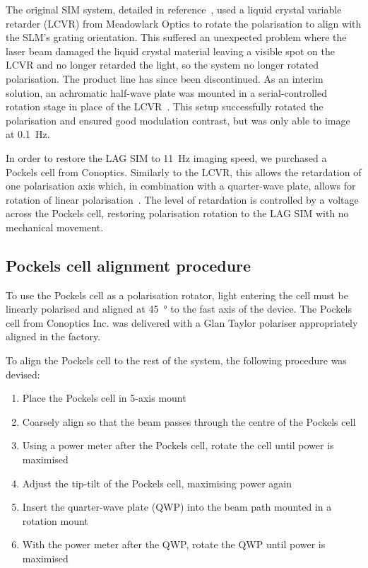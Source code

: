 
The original SIM system, detailed in reference~\cite{young2016guide}, used a liquid crystal variable retarder (LCVR) from Meadowlark Optics to rotate the polarisation to align with the SLM's grating orientation. 
This suffered an unexpected problem where the laser beam damaged the liquid crystal material leaving a visible spot on the LCVR and no longer retarded the light, so the system no longer rotated polarisation. 
The product line has since been discontinued.
As an interim solution, an achromatic half-wave plate was mounted in a serial-controlled rotation stage in place of the LCVR~\cite[\textit{ch. 8}]{hecht2017optics}. 
This setup successfully rotated the polarisation and ensured good modulation contrast, but was only able to image at \SI{0.1}{\hertz}. 

In order to restore the LAG SIM to \SI{11}{\hertz} imaging speed, we purchased a Pockels cell from Conoptics. 
Similarly to the LCVR, this allows the retardation of one polarisation axis which, in combination with a quarter-wave plate, allows for rotation of linear polarisation~\cite[\textit{ch. 8}]{hecht2017optics}.
The level of retardation is controlled by a voltage across the Pockels cell, restoring polarisation rotation to the LAG SIM with no mechanical movement. 

\subsection{Pockels cell alignment procedure}
To use the Pockels cell as a polarisation rotator, light entering the cell must be linearly polarised and aligned at \SI{45}{\degree} to the fast axis of the device. 
The Pockels cell from Conoptics Inc. was delivered with a Glan Taylor polariser appropriately aligned in the factory. 

To align the Pockels cell to the rest of the system, the following procedure was devised: %
\begin{enumerate}
	\item Place the Pockels cell in 5-axis mount
	\item Coarsely align so that the beam passes through the centre of the Pockels cell
	\item Using a power meter after the Pockels cell, rotate the cell until power is maximised
	\item Adjust the tip-tilt of the Pockels cell, maximising power again
	\item Insert the quarter-wave plate (QWP) into the beam path mounted in a rotation mount 
	\item With the power meter after the QWP, rotate the QWP until power is maximised
\end{enumerate}

